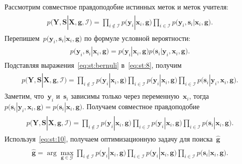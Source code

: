 \documentclass{dissert}
\begin{document}
Рассмотрим совместное правдоподобие истинных меток и меток учителя:
\begin{gather}
\label{eq:st:8}
\begin{aligned}
p\bigr(\mathbf{Y}, \mathbf{S}|\mathbf{X}, \mathbf{g}, \mathcal{I}\bigr)=\prod_{i\not\in \mathcal{I}}p\bigr(\mathbf{y}_i|\mathbf{x}_i, \mathbf{g}\bigr)\prod_{i\in \mathcal{I}}p\bigr(\mathbf{y}_i, \mathbf{s}_i|\mathbf{x}_i, \mathbf{g}\bigr).
\end{aligned}
\end{gather}
Перепишем~$p\bigr(\mathbf{y}_i, \mathbf{s}_i|\mathbf{x}_i, \mathbf{g}\bigr)$ по формуле условной вероятности:
\begin{gather}
\label{eq:st:bernuli}
\begin{aligned}
p\bigr(\mathbf{y}_i, \mathbf{s}_i|\mathbf{x}_i, \mathbf{g}\bigr) = p\bigr(\mathbf{y}_i|\mathbf{x}_i, \mathbf{g}\bigr)p\bigr(\mathbf{s}_i|\mathbf{y}_i, \mathbf{x}_i, \mathbf{g}\bigr).
\end{aligned}
\end{gather}
Подставляя выражения~\eqref{eq:st:bernuli} в~\eqref{eq:st:8}, получим
\begin{gather}
\label{eq:st:9}
\begin{aligned}
p\bigr(\mathbf{Y}, \mathbf{S}|\mathbf{X}, \mathbf{g}, \mathcal{I}\bigr)=\prod_{i\not\in \mathcal{I}}p\bigr(\mathbf{y}_i|\mathbf{x}_i, \mathbf{g}\bigr)\prod_{i\in \mathcal{I}}p\bigr(\mathbf{y}_i|\mathbf{x}_i, \mathbf{g}\bigr)\prod_{i\in \mathcal{I}}p\bigr(\mathbf{s}_i|\mathbf{y}_i, \mathbf{x}_i, \mathbf{g}\bigr).
\end{aligned}
\end{gather}
Заметим, что~$\mathbf{y}_i$ и~$\mathbf{s}_i$ зависимы только через переменную~$\mathbf{x}_i$, тогда~$p\bigr(\mathbf{s}_i|\mathbf{y}_i, \mathbf{x}_i, \mathbf{g}\bigr)=p\bigr(\mathbf{s}_i|\mathbf{x}_i, \mathbf{g}\bigr)$. Получаем совместное правдоподобие
\begin{gather}
\label{eq:st:10}
\begin{aligned}
p\bigr(\mathbf{Y}, \mathbf{S}|\mathbf{X}, \mathbf{g}, \mathcal{I}\bigr)=\prod_{i\not\in \mathcal{I}}p\bigr(\mathbf{y}_i|\mathbf{x}_i, \mathbf{g}\bigr)\prod_{i\in \mathcal{I}}p\bigr(\mathbf{y}_i|\mathbf{x}_i, \mathbf{g}\bigr)\prod_{i\in \mathcal{I}}p\bigr(\mathbf{s}_i|\mathbf{x}_i, \mathbf{g}\bigr).
\end{aligned}
\end{gather}
Используя~\eqref{eq:st:10}, получаем оптимизационную задачу для поиска~$\hat{\mathbf{g}}$
\begin{gather}
\label{eq:st:11}
\begin{aligned}
\hat{\mathbf{g}} = \arg\max_{\mathbf{g}\in \mathcal{G}} \prod_{i\not\in \mathcal{I}}p\bigr(\mathbf{y}_i|\mathbf{x}_i, \mathbf{g}\bigr)\prod_{i\in \mathcal{I}}p\bigr(\mathbf{y}_i|\mathbf{x}_i, \mathbf{g}\bigr)\prod_{i\in \mathcal{I}}p\bigr(\mathbf{s}_i|\mathbf{x}_i, \mathbf{g}\bigr).
\end{aligned}
\end{gather}
\end{document}
